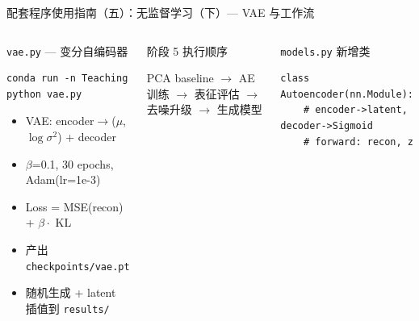 \documentclass[aspectratio=169]{ctexbeamer}
\begin{document}
\begin{frame}[fragile,shrink=20]{配套程序使用指南（五）：无监督学习（下）— VAE 与工作流}
\small

\begin{columns}[T]
\begin{block}{\texttt{vae.py} — 变分自编码器}
\begin{lstlisting}[basicstyle=\ttfamily\scriptsize, frame=none, numbers=none, backgroundcolor=\color{codebg}]
conda run -n Teaching python vae.py
\end{lstlisting}
\vspace{-0.35cm}
\begin{itemize}
  \item VAE: encoder$\to$($\mu$,$\log\sigma^2$) + decoder
  \item $\beta$=0.1, 30 epochs, Adam(lr=1e-3)
  \item Loss = MSE(recon) + $\beta \cdot$ KL
  \item 产出 \texttt{checkpoints/vae.pt}
  \item 随机生成 + latent 插值到 \texttt{results/}
\end{itemize}
\end{block}

\vspace{0.1cm}

\begin{block}{阶段 5 执行顺序}
\footnotesize
\begin{center}
\end{center}
\vspace{-0.1cm}
{\footnotesize PCA baseline $\to$ AE 训练 $\to$ 表征评估 $\to$ 去噪升级 $\to$ 生成模型}
\end{block}

\begin{block}{\texttt{models.py} 新增类}
\footnotesize
\begin{lstlisting}[basicstyle=\ttfamily\scriptsize, frame=none, numbers=none, backgroundcolor=\color{codebg}]
class Autoencoder(nn.Module):
    # encoder->latent, decoder->Sigmoid
    # forward: recon, z


\end{lstlisting}
\end{block}
\end{columns}
\end{frame}
\end{document}
